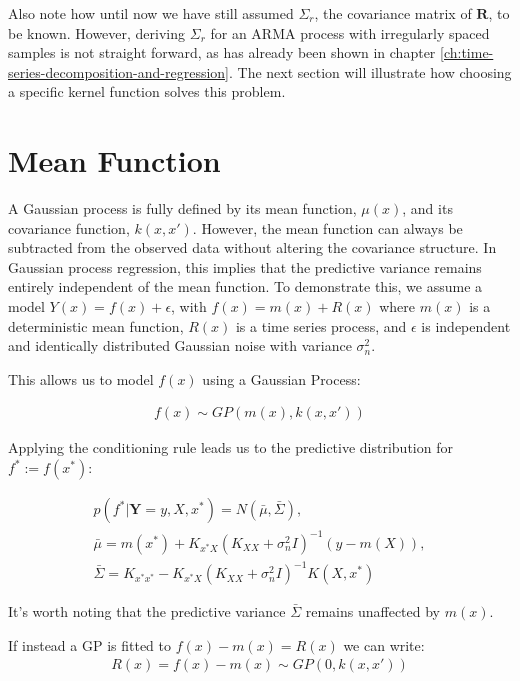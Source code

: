 Also note how until now we have still assumed $\Sigma_r$, the covariance matrix of $\mathbf{R}$, to be known.
However, deriving $\Sigma_r$ for an ARMA process with irregularly spaced samples is not straight forward, as has already
been shown in chapter \ref{ch:time-series-decomposition-and-regression}.
The next section will illustrate how choosing a specific kernel function solves this problem.

\section{Mean Function}\label{subsec:mean-function}

A Gaussian process is fully defined by its mean function, $\mu(x)$,
and its covariance function, $k(x, x')$. However, the mean function can always be subtracted from
the observed data without altering the covariance structure. In Gaussian process regression,
this implies that the predictive variance remains entirely independent of the mean function.
To demonstrate this, we assume a model $Y(x) = f(x) + \epsilon$,
with $f(x) = m(x) + R(x)$ where $m(x)$ is a deterministic mean function, $R(x)$ is a time series
process, and $\epsilon$ is independent and identically distributed Gaussian noise with variance $\sigma_n^{2}$.

This allows us to model $f(x)$ using a Gaussian Process:

\begin{gather*}
    f(x) \sim GP(m(x), k(x,x'))
\end{gather*}

Applying the conditioning rule leads us to the predictive distribution for $f^{\ast} := f(x^{\ast})$:

\begin{gather*}
    p(f^{\ast}| \mathbf{Y}= y, X, x^{\ast}) = N(\bar{\mu}, \bar{\Sigma}), \\
    \bar{\mu} = m(x^{\ast}) + K_{x^{\ast}X} (K_{XX} + \sigma_{n}^2 I )^{-1}(y - m(X)),\\
    \bar{\Sigma} = K_{x^{\ast}x^{\ast}} - K_{x^{\ast}X} (K_{XX} +  \sigma_{n}^2 I )^{-1} K(X, x^{\ast})
\end{gather*}

It's worth noting that the predictive variance $\bar{\Sigma}$ remains unaffected by $m(x)$.

If instead a GP is fitted to $f(x) - m(x) = R(x)$ we can write:
\begin{gather*}
    R(x) = f(x) - m(x) \sim GP(0, k(x,x'))
\end{gather*}

